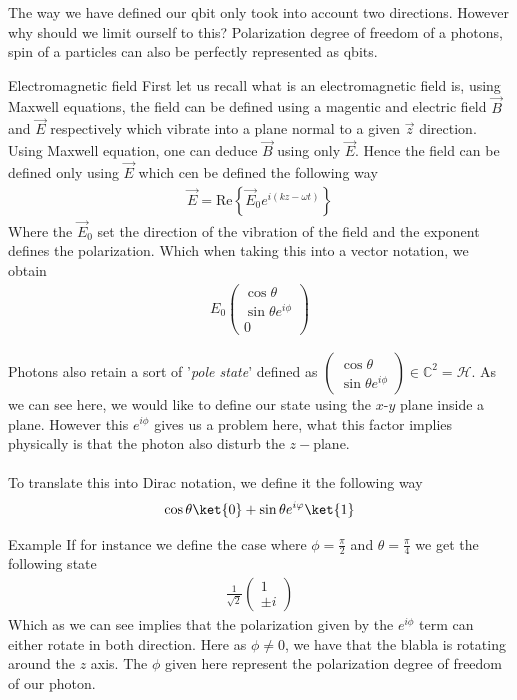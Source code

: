 The way we have defined our qbit only took into account two directions. However why should we limit ourself to this? Polarization degree of freedom of a photons, spin of a particles can also be perfectly represented as qbits.\\
\begin{parag}{Electromagnetic field}
    First let us recall what is an electromagnetic field is, using Maxwell equations, the field can be defined using a magentic and electric field $\vec{B}$ and $\vec{E}$ respectively which vibrate into a plane normal to a given $\vec{z}$ direction. Using Maxwell equation, one can deduce $\vec{B}$ using only $\vec{E}$. Hence the field can be defined only using $\vec{E}$ which cen be defined the following way 
	\begin{align*} 
		\vec{E} = \text{Re}\left\{\vec{E}_0 e^{i\left(kz - \omega t\right)}\right\} 
	\end{align*}
	Where the $\vec{E}_0$ set the direction of the vibration of the field and the exponent defines the polarization. Which when taking this into a vector notation, we obtain 
	\begin{align*} 
		E_0 \begin{pmatrix} \cos \theta \\ \sin \theta e^{i \phi} \\ 0 \end{pmatrix}  
	\end{align*}
\end{parag}
	Photons also retain a sort of '\textit{pole state}' defined as $\begin{pmatrix} \cos \theta \\ \sin \theta e^{i\phi} \end{pmatrix}  \in \mathbb{C}^2 =  \mathcal{H}$. As we can see here, we would like to define our state using the $x$-$y$ plane inside a plane. However this $e^{i\phi}$ gives us a problem here, what this factor implies physically is that the photon also disturb the $z-$plane. \\
	$ $\\
	To translate this into Dirac notation, we define it the following way 
	\begin{align*} 
		\cos \theta \ket{0} + \sin \theta e^{i\phi} \ket{1} 
	\end{align*}
	\begin{parag}{Example}
		If for instance we define the case where $\phi = \frac{\pi}{2}$ and $\theta = \frac{\pi}{4}$ we get the following state
		\begin{align*} 
			 \frac{1}{\sqrt{2}} \begin{pmatrix} 1 \\ \pm i \end{pmatrix} 
		\end{align*}
		Which as we can see implies that the polarization given by the $e^{i\phi}$ term can either rotate in both direction. Here as $\phi \neq 0$, we have that the blabla is rotating around the $z$ axis. The $\phi$ given here represent the polarization degree of freedom of our photon.
	\end{parag}
	

